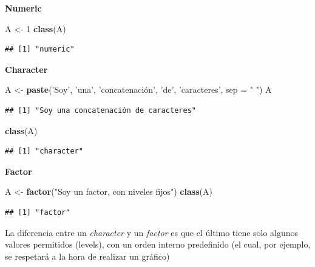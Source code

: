 \documentclass[]{book}
\newenvironment{Shaded}{\begin{snugshade}}{\end{snugshade}}
\newcommand{\DecValTok}[1]{\textcolor[rgb]{0.00,0.00,0.81}{#1}}
\newcommand{\KeywordTok}[1]{\textcolor[rgb]{0.13,0.29,0.53}{\textbf{#1}}}
\newcommand{\NormalTok}[1]{#1}
\newcommand{\StringTok}[1]{\textcolor[rgb]{0.31,0.60,0.02}{#1}}
\begin{document}
\textbf{Numeric}

\begin{Shaded}
\begin{Highlighting}[]
\NormalTok{A <-}\StringTok{  }\DecValTok{1}
\KeywordTok{class}\NormalTok{(A)}
\end{Highlighting}
\end{Shaded}

\begin{verbatim}
## [1] "numeric"
\end{verbatim}

\textbf{Character}

\begin{Shaded}
\begin{Highlighting}[]
\NormalTok{A <-}\StringTok{  }\KeywordTok{paste}\NormalTok{(}\StringTok{'Soy'}\NormalTok{, }\StringTok{'una'}\NormalTok{, }\StringTok{'concatenación', '}\NormalTok{de}\StringTok{', '}\NormalTok{caracteres}\StringTok{', sep = " ")}
\StringTok{A}
\end{Highlighting}
\end{Shaded}

\begin{verbatim}
## [1] "Soy una concatenación de caracteres"
\end{verbatim}

\begin{Shaded}
\begin{Highlighting}[]
\KeywordTok{class}\NormalTok{(A)}
\end{Highlighting}
\end{Shaded}

\begin{verbatim}
## [1] "character"
\end{verbatim}

\textbf{Factor}

\begin{Shaded}
\begin{Highlighting}[]
\NormalTok{A <-}\StringTok{ }\KeywordTok{factor}\NormalTok{(}\StringTok{"Soy un factor, con niveles fijos"}\NormalTok{)}
\KeywordTok{class}\NormalTok{(A)}
\end{Highlighting}
\end{Shaded}

\begin{verbatim}
## [1] "factor"
\end{verbatim}

La diferencia entre un \emph{character} y un \emph{factor} es que el último tiene solo algunos valores permitidos (levels), con un orden interno predefinido (el cual, por ejemplo, se respetará a la hora de realizar un gráfico)
\end{document}
